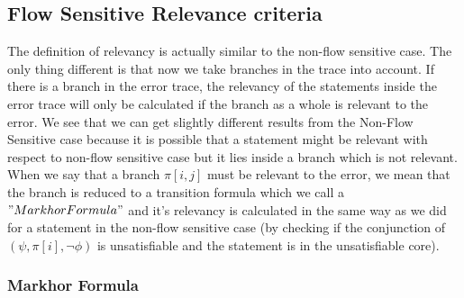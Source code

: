 \documentclass{article}
\begin{document}
\subsection{Flow Sensitive Relevance criteria }
The definition of relevancy is actually similar to the non-flow sensitive case. The only thing different is that now we take branches in the trace into account. If there is a branch in the error trace, the relevancy of the statements inside the error trace will only be calculated if the branch as a whole is relevant to the error. We see that we can get slightly different results from the Non-Flow Sensitive case because it is possible that a statement might be relevant with respect to non-flow sensitive case but it lies inside a branch which is not relevant. \\
When we say that a branch $\pi[i,j]$ must be relevant to the error, we mean that the branch is reduced to a transition formula which we call a $"Markhor Formula"$ and it's relevancy is calculated in the same way as we did for a statement in the non-flow sensitive case (by checking if the conjunction of $(\psi, \pi[i],\neg \phi)$ is unsatisfiable and the statement is in the unsatisfiable core).

\subsubsection{Markhor Formula}

  
\end{document}
